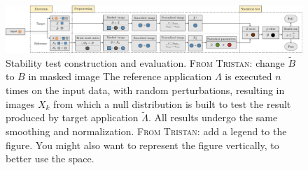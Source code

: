 \documentclass[lettersize,journal]{IEEEtran}
\newcommand{\TG}[1]{\color{blue}\textsc{From Tristan:} #1\color{black}\xspace}
\begin{document}
\begin{figure}
    \centering
    \includegraphics[width=\linewidth]{figures/workflow_H.pdf}
    \caption{Stability test construction and evaluation. \TG{change $\tilde B$ to $B$ in masked image} The reference application $\Lambda$ is executed $n$ times on the input data, with random perturbations, resulting in images $X_k$ from which a null distribution is built to test the result produced by target application $\tilde \Lambda$. All results undergo the same smoothing and normalization. \TG{add a legend to the figure. You might also want to represent the figure vertically, to better use the space.}}
    \label{fig:test_workflow}
\end{figure}
\end{document}
